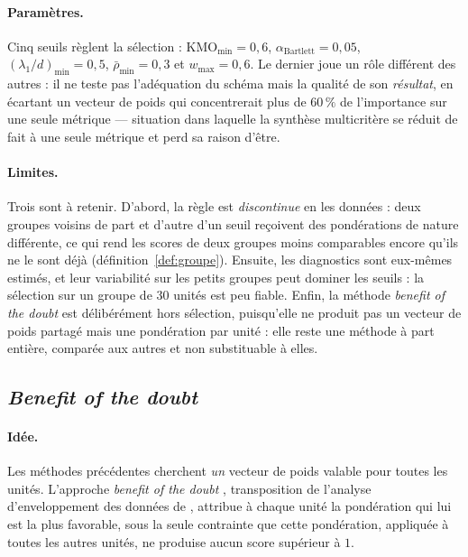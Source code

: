 \documentclass[11pt,a4paper]{article}
\theoremstyle{definition}
\theoremstyle{remark}
\begin{document}
\bigskip

\paragraph{Paramètres.} Cinq seuils règlent la sélection : $\mathrm{KMO}_{\min} = 0{,}6$,
$\alpha_{\mathrm{Bartlett}} = 0{,}05$, $(\lambda_1/d)_{\min} = 0{,}5$,
$\bar{\rho}_{\min} = 0{,}3$ et $w_{\max} = 0{,}6$. Le dernier joue un rôle différent des
autres : il ne teste pas l'adéquation du schéma mais la qualité de son \emph{résultat},
en écartant un vecteur de poids qui concentrerait plus de $60\,\%$ de l'importance sur une
seule métrique --- situation dans laquelle la synthèse multicritère se réduit de fait à
une seule métrique et perd sa raison d'être.

\bigskip

\paragraph{Limites.} Trois sont à retenir. D'abord, la règle est \emph{discontinue} en les
données : deux groupes voisins de part et d'autre d'un seuil reçoivent des pondérations de
nature différente, ce qui rend les scores de deux groupes moins comparables encore qu'ils
ne le sont déjà (définition~\ref{def:groupe}). Ensuite, les diagnostics sont eux-mêmes
estimés, et leur variabilité sur les petits groupes peut dominer les seuils : la sélection
sur un groupe de $30$ unités est peu fiable. Enfin, la méthode \emph{benefit of the doubt}
est délibérément hors sélection, puisqu'elle ne produit pas un vecteur de poids partagé
mais une pondération par unité : elle reste une méthode à part entière, comparée aux
autres et non substituable à elles.

\bigskip

\subsection{\emph{Benefit of the doubt}}
\label{sec:bod}

\medskip

\paragraph{Idée.} Les méthodes précédentes cherchent \emph{un} vecteur de poids valable
pour toutes les unités. L'approche \emph{benefit of the doubt} \citep{cherchye2007},
transposition de l'analyse d'enveloppement des données de \citet{charnes1978}, attribue à
chaque unité la pondération qui lui est la plus favorable, sous la seule contrainte que
cette pondération, appliquée à toutes les autres unités, ne produise aucun score supérieur
à $1$.
\end{document}
